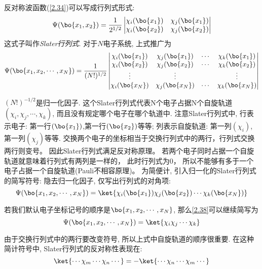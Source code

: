 反对称波函数(\autoref{2.34})可以写成行列式形式:
\begin{equation}
\Psi(\bo{x_1,x_2})=\frac{1}{2^{1/2}}
\begin{vmatrix}
\chi_i(\bo{x_1})&\chi_j(\bo{x_1})\\
\chi_i(\bo{x_2})&\chi_j(\bo{x_2})
\end{vmatrix}
\end{equation}
这式子叫作\emph{Slater行列式}.
对于$N$电子系统, 
上式推广为
\begin{equation}
\Psi(\bo{x_1,x_2,\cdots,x_N})=\frac{1}{(N!)^{1/2}}
\begin{vmatrix}
\chi_i(\bo{x_1})&\chi_j(\bo{x_1})&\cdots&\chi_k(\bo{x_1})\\
\chi_i(\bo{x_2})&\chi_j(\bo{x_2})&\cdots&\chi_k(\bo{x_2})\\
\vdots			&\vdots			& \,&\vdots\\
\chi_i(\bo{x_N})&\chi_j(\bo{x_N})&\cdots&\chi_k(\bo{x_N})
\end{vmatrix}
\end{equation}

$(N!)^{-1/2}$是归一化因子. 
这个Slater行列式代表N个电子占据N个自旋轨道$(\chi_i,\chi_j,\cdots,\chi_k)$, 
而且没有规定哪个电子在哪个轨道中. 
注意Slater行列式中, 行表示电子: 第一行$(\bo{x_1})$,第一行$(\bo{x_2})$等等; 
列表示自旋轨道: 第一列$(\chi_i)$,第一列$(\chi_j)$等等. 
交换两个电子的坐标相当于交换行列式中的两行，行列式交换两行则变号。
因此Slater行列式满足反对称原理。
若两个电子同时占据一个自旋轨道就意味着行列式有两列是一样的，
此时行列式为$0$，
所以不能够有多于一个电子占据一个自旋轨道(Pauli不相容原理)。
为简便计, 引入归一化的Slater行列式的简写符号: 隐去归一化因子, 仅写出行列式的对角项:
\begin{equation}
\label{2.38}
\Psi(\bo{x_1,x_2,\cdots,x_N})=\ket{\chi_i(\bo{x_1})\chi_j(\bo{x_2})\cdots\chi_k(\bo{x_N})}
\end{equation}

若我们默认电子坐标记号的顺序是$\bo{x_1,x_2,\cdots,x_N}$, 
那么\autoref{2.38}可以继续简写为
\begin{equation}
\Psi(\bo{x_1,x_2,\cdots,x_N})=\ket{\chi_i\chi_j\cdots\chi_k}
\end{equation}

由于交换行列式中的两行要改变符号, 
所以上式中自旋轨道的顺序很重要. 
在这种简计符号中, 
Slater行列式的反对称性表现在:
\begin{equation}\label{2.40}
\ket{\cdots\chi_m\cdots\chi_n\cdots}=-\ket{\cdots\chi_n\cdots\chi_m\cdots}
\end{equation}

